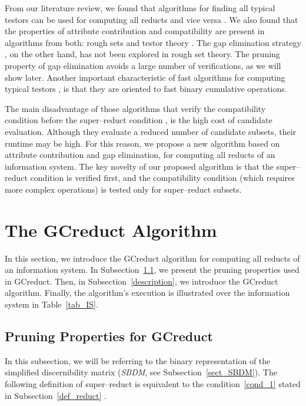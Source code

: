 \documentclass[number,preprint,review,12pt]{elsarticle}
\begin{document}
  From our literature review, we found that algorithms for finding all typical testors can be used for computing all reducts and vice versa \citep{Lazo15}. We also found that the properties of attribute contribution and compatibility are present in algorithms from both: rough sets \citep{WangP07} and testor theory \citep{Sanchez10,Lias13}. The gap elimination strategy \citep{Santiesteban03,Lias13}, on the other hand, has not been explored in rough set theory. The pruning property of gap elimination avoids a large number of verifications, as we will show later. Another important characteristic of fast algorithms for computing typical testors \citep{Sanchez10,Lias13}, is that they are oriented to fast binary cumulative operations. 
  
  The main disadvantage of those algorithms that verify the compatibility condition before the super--reduct condition \citep{Santiesteban03,WangP07,Lias13}, is the high cost of candidate evaluation. Although they evaluate a reduced number of candidate subsets, their runtime may be high. For this reason, we propose a new algorithm based on attribute contribution and gap elimination, for computing all reducts of an information system. The key novelty of our proposed algorithm is that the super--reduct condition is verified first, and the compatibility condition (which requires more complex operations) is tested only for super--reduct subsets.
  
  
\section{The GCreduct Algorithm}\label{GCreduct}
  In this section, we introduce the GCreduct algorithm for computing all reducts of an information system. In  Subsection~\ref{properties}, we present the pruning properties used in GCreduct. Then, in Subsection~\ref{description}, we introduce the GCreduct algorithm. Finally, the algorithm's execution is illustrated over the information system in Table~\ref{tab_IS}.
  
\subsection{Pruning Properties for GCreduct}\label{properties}
	In this subsection, we will be referring to the binary representation of the simplified discernibility matrix (\textit{SBDM}, see Subsection~\ref{sect_SBDM}). The following definition of super--reduct is equivalent to the condition~\ref{cond_1} stated in Subsection~\ref{def_reduct} \citep{Lazo15}.
	
\end{document}
